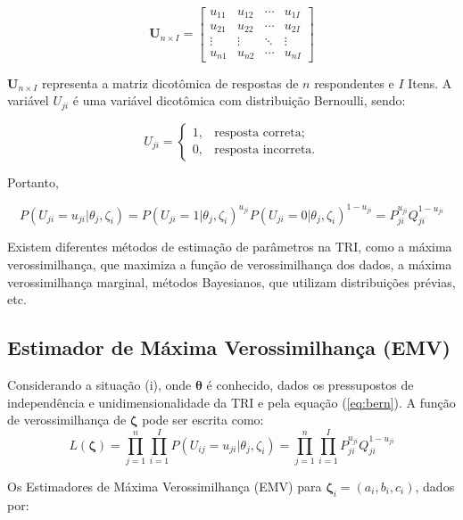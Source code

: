 \[ \textbf{U}_{n\times I} =  
\begin{bmatrix}
	u_{11} & u_{12} & \cdots & u_{1I} \\
	u_{21} & u_{22} & \cdots & u_{2I} \\
	\vdots & \vdots & \ddots & \vdots\\
	u_{n1} & u_{n2} & \cdots & u_{nI}
\end{bmatrix}
\]

\noindent $\textbf{U}_{n\times I}$ representa a matriz dicotômica de respostas de $ n $ respondentes e $ I $ Itens. A variável $U_{ji}$ é uma variável dicotômica com distribuição Bernoulli, sendo:

\[U_{ji} =    \begin{cases}
	
	  1, & \mbox{resposta correta;}  \\
	
	  0, & \mbox{resposta incorreta.}
	
\end{cases}
\]

Portanto,  

\begin{equation} \label{eq:bern}
P(U_{ji} = u_{ji}|\theta_j, \zeta_i) = P(U_{ji} = 1|\theta_j, \zeta_i)^{u_{ji}}
P(U_{ji} = 0|\theta_j, \zeta_i)^{1 - u_{ji}} = P_{ji}^{u_{ji}}Q_{ji}^{1-u_{ji}}
\end{equation}

Existem diferentes métodos de estimação de parâmetros na TRI, como a máxima verossimilhança, que maximiza a função de verossimilhança dos dados, a máxima verossimilhança marginal, métodos Bayesianos, que utilizam distribuições prévias, etc.

\subsection{Estimador de Máxima Verossimilhança (EMV)}

Considerando a situação (i), onde $ \boldsymbol{\theta} $ é conhecido, dados os pressupostos de independência e unidimensionalidade da TRI e pela equação (\ref{eq:bern}). A função de verossimilhança de  $ \boldsymbol{\zeta} $ pode ser escrita como:
\[
L(\boldsymbol{\zeta}) =  \prod_{j=1}^{n}\prod_{i=1}^{I}P(U_{ij} = u_{ji}|\theta_j, \zeta_i) = \prod_{j=1}^{n}\prod_{i=1}^{I}P_{ji}^{u_{ji}}Q_{ji}^{1-u_{ji}}
\]

Os Estimadores de Máxima Verossimilhança (EMV) para $ \boldsymbol{\zeta}_i = (a_i, b_i , c_i )$, dados por:\\


